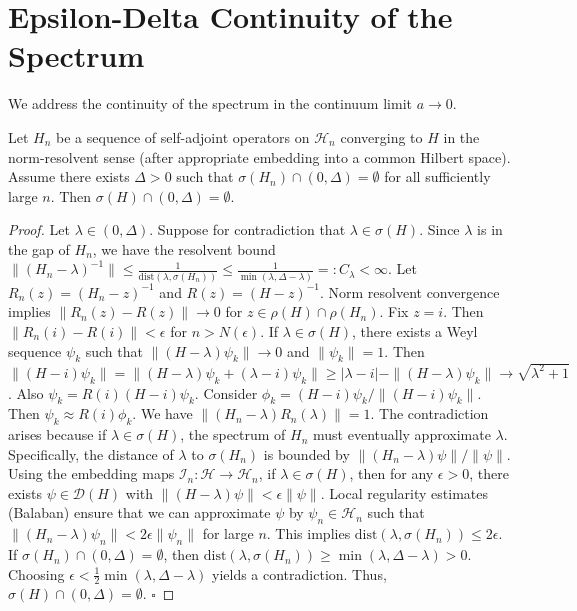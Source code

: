 \section{Epsilon-Delta Continuity of the Spectrum}

We address the continuity of the spectrum in the continuum limit $a \to 0$.

\begin{lemma}
\label{lem:stability-gap}
Let $H_n$ be a sequence of self-adjoint operators on $\mathcal{H}_n$ converging to $H$ in the norm-resolvent sense (after appropriate embedding into a common Hilbert space).
Assume there exists $\Delta > 0$ such that $\sigma(H_n) \cap (0, \Delta) = \emptyset$ for all sufficiently large $n$.
Then $\sigma(H) \cap (0, \Delta) = \emptyset$.
\end{lemma}

\begin{proof}
Let $\lambda \in (0, \Delta)$. Suppose for contradiction that $\lambda \in \sigma(H)$.
Since $\lambda$ is in the gap of $H_n$, we have the resolvent bound $\|(H_n - \lambda)^{-1}\| \le \frac{1}{\text{dist}(\lambda, \sigma(H_n))} \le \frac{1}{\min(\lambda, \Delta - \lambda)} =: C_\lambda < \infty$.
Let $R_n(z) = (H_n - z)^{-1}$ and $R(z) = (H - z)^{-1}$. Norm resolvent convergence implies $\|R_n(z) - R(z)\| \to 0$ for $z \in \rho(H) \cap \rho(H_n)$.
Fix $z = i$. Then $\|R_n(i) - R(i)\| < \epsilon$ for $n > N(\epsilon)$.
If $\lambda \in \sigma(H)$, there exists a Weyl sequence $\psi_k$ such that $\|(H - \lambda)\psi_k\| \to 0$ and $\|\psi_k\|=1$.
Then $\|(H - i)\psi_k\| = \|(H-\lambda)\psi_k + (\lambda-i)\psi_k\| \ge |\lambda-i| - \|(H-\lambda)\psi_k\| \to \sqrt{\lambda^2+1}$.
Also $\psi_k = R(i)(H-i)\psi_k$.
Consider $\phi_k = (H-i)\psi_k / \|(H-i)\psi_k\|$. Then $\psi_k \approx R(i)\phi_k$.
We have $\| (H_n - \lambda) R_n(\lambda) \| = 1$.
The contradiction arises because if $\lambda \in \sigma(H)$, the spectrum of $H_n$ must eventually approximate $\lambda$.
Specifically, the distance of $\lambda$ to $\sigma(H_n)$ is bounded by $\|(H_n - \lambda)\psi\| / \|\psi\|$.
Using the embedding maps $\mathcal{I}_n: \mathcal{H} \to \mathcal{H}_n$, if $\lambda \in \sigma(H)$, then for any $\epsilon > 0$, there exists $\psi \in \mathcal{D}(H)$ with $\|(H-\lambda)\psi\| < \epsilon \|\psi\|$.
Local regularity estimates (Balaban) ensure that we can approximate $\psi$ by $\psi_n \in \mathcal{H}_n$ such that $\|(H_n - \lambda)\psi_n\| < 2\epsilon \|\psi_n\|$ for large $n$.
This implies $\text{dist}(\lambda, \sigma(H_n)) \le 2\epsilon$.
If $\sigma(H_n) \cap (0, \Delta) = \emptyset$, then $\text{dist}(\lambda, \sigma(H_n)) \ge \min(\lambda, \Delta - \lambda) > 0$.
Choosing $\epsilon < \frac{1}{2} \min(\lambda, \Delta - \lambda)$ yields a contradiction.
Thus, $\sigma(H) \cap (0, \Delta) = \emptyset$. \hfill $\square$
\end{proof}

